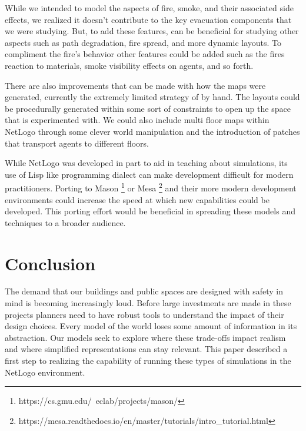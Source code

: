 \documentclass[12pt,letterpaper]{article}
\begin{document}

While we intended to model the aspects of fire, smoke, and their associated side effects, we realized it doesn't contribute to the key evacuation components that we were studying.  But, to add these features, can be beneficial for studying other aspects such as path degradation, fire spread, and more dynamic layouts.  To compliment the fire's behavior other features could be added such as the fires reaction to materials, smoke visibility effects on agents, and so forth. 

There are also improvements that can be made with how the maps were generated, currently the extremely limited strategy of by hand.  The layouts could be procedurally generated within some sort of constraints to open up the space that is experimented with.  We could also include multi floor maps within NetLogo through some clever world manipulation and the introduction of patches that transport agents to different floors.


While NetLogo was developed in part to aid in teaching about simulations, its use of Lisp like programming dialect can make development difficult for modern practitioners.  Porting to Mason \footnote{https://cs.gmu.edu/~eclab/projects/mason/} or Mesa \footnote{https://mesa.readthedocs.io/en/master/tutorials/intro\_tutorial.html} and their more modern development environments could increase the speed at which new capabilities could be developed.  This porting effort would be beneficial in spreading these models and techniques to a broader audience. 

\section {Conclusion}

The demand that our buildings and public spaces are designed with safety in mind is becoming increasingly loud.  Before large investments are made in these projects planners need to have robust tools to understand the impact of their design choices.  Every model of the world loses some amount of information in its abstraction.  Our models seek to explore where these trade-offs impact realism and where simplified representations can stay relevant.  This paper described a first step to realizing the capability of running these types of simulations in the NetLogo environment.
\end{document}
